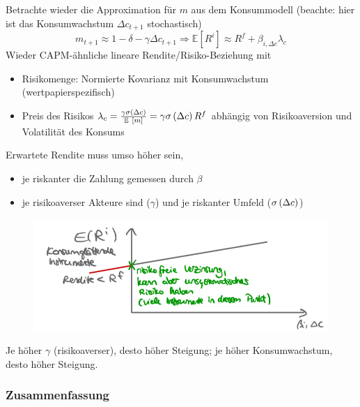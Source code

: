 \documentclass[12pt]{extreport} %
\theoremstyle{named}
\theoremstyle{nnamed}
\theoremstyle{itshape}
\theoremstyle{normal}
\begin{document}
Betrachte wieder die Approximation für $m$ aus dem Konsummodell (beachte: hier ist das Konsumwachstum $\Delta c_{t+1}$ stochastisch)
	$$ m_{t+1} \approx 1 - \delta - \gamma \Delta c_{t+1} \Rightarrow \mathbb{E} \left[ R^i \right] \approx R^f + \beta_{i, \Delta c} \lambda_c $$
Wieder CAPM-ähnliche lineare Rendite/Risiko-Beziehung mit
\begin{itemize}
	\item Risikomenge: Normierte Kovarianz mit Konsumwachstum (wertpapierspezifisch)
	\item Preis des Risikos $\lambda_c = \frac{\gamma \var \left( \Delta c \right)}{\mathbb{E} \left[ m \right]} = \gamma \var \left( \Delta c \right) R^f$ abhängig von Risikoaversion und Volatilität des Konsums
\end{itemize}
Erwartete Rendite muss umso höher sein,
\begin{itemize}
	\item je riskanter die Zahlung gemessen durch $\beta$
	\item je risikoaverser Akteure sind ($\gamma$) und je riskanter Umfeld ($\sigma \left( \Delta c \right)$)
\end{itemize}

\begin{figure}[h!] \centering
	\includegraphics[scale=0.6]{img/p47-2}
\end{figure}

Je höher $\gamma$ (risikoaverser), desto höher Steigung; je höher Konsumwachstum, desto höher Steigung.

\subsubsection*{Zusammenfassung}
\end{document}
